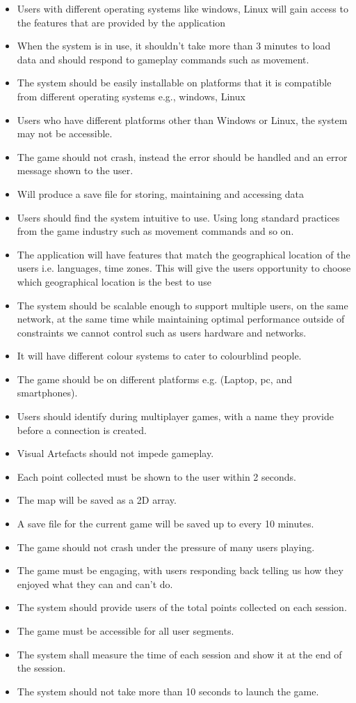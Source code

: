 \documentclass{article}
\begin{document}
\begin{itemize}
	\item Users with different operating systems like windows, Linux will gain access to the features that are provided by the application
	\item When the system is in use, it shouldn’t take more than 3 minutes to load data and should respond to gameplay commands such as movement.
	\item The system should be easily installable on platforms that it is compatible from different operating systems e.g., windows, Linux
	\item Users who have different platforms other than Windows or Linux, the system may not be accessible.
	\item The game should not crash, instead the error should be handled and an error message shown to the user.
	\item Will produce a save file for storing, maintaining and accessing data
	\item Users should find the system intuitive to use. Using long standard practices from the game industry such as movement commands and so on.
	\item The application will have features that match the geographical location of the users i.e. languages, time zones. This will give the users opportunity to choose which geographical location is the best to use
	\item The system should be scalable enough to support multiple users, on the same network, at the same time while maintaining optimal performance outside of constraints we cannot control such as users hardware and networks.
	\item It will have different colour systems to cater to colourblind people.
	\item The game should be on different platforms e.g. (Laptop, pc, and smartphones).
	\item Users should identify during multiplayer games, with a name they provide before a connection is created.
	\item Visual Artefacts should not impede gameplay.
	\item Each point collected must be shown to the user within 2 seconds.
	\item The map will be saved as a 2D array.
	\item A save file for the current game will be saved up to every 10 minutes.
	\item The game should not crash under the pressure of many users playing.
	\item The game must be engaging, with users responding back telling us how they enjoyed what they can and can’t do.
	\item The system should provide users of the total points collected on each session.
	\item The game must be accessible for all user segments.
	\item The system shall measure the time of each session and show it at the end of the session.
	\item The system should not take more than 10 seconds to launch the game.
\end{itemize}
\end{document}
